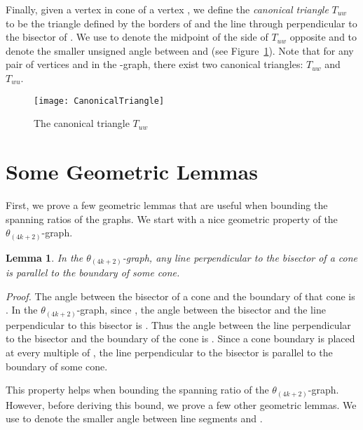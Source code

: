 \documentclass[12pt]{article}
\newtheorem{lem}[defin]{Lemma}
\newenvironment{lemma}{\begin{lem} \sl}{\end{lem}}
\newenvironment{proof}{\emph{Proof.}}{\hfill \\}
\newcommand{\graph}[1]{\ensuremath{\theta_{(4 k + #1)}}-graph\xspace}
\newcommand{\canon}[2]{\ensuremath{T_{#1 #2}}}
\begin{document}
Finally, given a vertex  in cone  of a vertex , we define the \emph{canonical triangle} \canon{u}{w} to be the triangle defined by the borders of  and the line through  perpendicular to the bisector of . We use  to denote the midpoint of the side of \canon{u}{w} opposite  and  to denote the smaller unsigned angle between  and  (see Figure~\ref{fig:CanonicalTriangle}). Note that for any pair of vertices  and  in the -graph, there exist two canonical triangles: \canon{u}{w} and \canon{w}{u}. 

\begin{figure}[ht]
  \begin{center}
    \texttt{[image: CanonicalTriangle]}
  \end{center}
  \caption{The canonical triangle \canon{u}{w}}
  \label{fig:CanonicalTriangle}
\end{figure}


\section{Some Geometric Lemmas}
\label{sec:GeometricLemmas}
First, we prove a few geometric lemmas that are useful when bounding the spanning ratios of the graphs. We start with a nice geometric property of the \graph{2}. 

\begin{lemma}
  \label{lem:Boundary}
  In the \graph{2}, any line perpendicular to the bisector of a cone is parallel to the boundary of some cone. 
\end{lemma}
\begin{proof}
  The angle between the bisector of a cone and the boundary of that cone is . In the \graph{2}, since , the angle between the bisector and the line perpendicular to this bisector is . Thus the angle between the line perpendicular to the bisector and the boundary of the cone is . Since a cone boundary is placed at every multiple of , the line perpendicular to the bisector is parallel to the boundary of some cone. 
\end{proof}

This property helps when bounding the spanning ratio of the \graph{2}. However, before deriving this bound, we prove a few other geometric lemmas. We use  to denote the smaller angle between line segments  and . 
\end{document}
